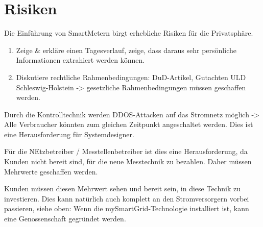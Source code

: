 
\section{Risiken}\label{sec:risiken}
Die Einführung von SmartMetern birgt erhebliche Risiken für die
Privatsphäre.

\begin{enumerate}
  \item Zeige \& erkläre einen Tagesverlauf, zeige, dass daraus sehr
	persönliche Informationen extrahiert werden können.
  \item Diskutiere rechtliche Rahmenbedingungen: DuD-Artikel, Gutachten
	ULD Schleswig-Holstein -> gesetzliche Rahmenbedingungen müssen
	geschaffen werden.
\end{enumerate}

Durch die Kontrolltechnik werden DDOS-Attacken auf das Stromnetz möglich
-> Alle Verbraucher könnten zum gleichen Zeitpunkt angeschaltet werden.
Dies ist eine Herausforderung für Systemdesigner.

Für die NEtzbetreiber / Messtellenbetreiber ist dies eine
Herausforderung, da Kunden nicht bereit sind, für die neue Messtechnik
zu bezahlen. Daher müssen Mehrwerte geschaffen werden.

Kunden müssen diesen Mehrwert sehen und bereit sein, in diese Technik zu
investieren. Dies kann natürlich auch komplett an den Stromversorgern
vorbei passieren, siehe oben: Wenn die mySmartGrid-Technologie
installiert ist, kann eine Genossenschaft gegründet werden.
